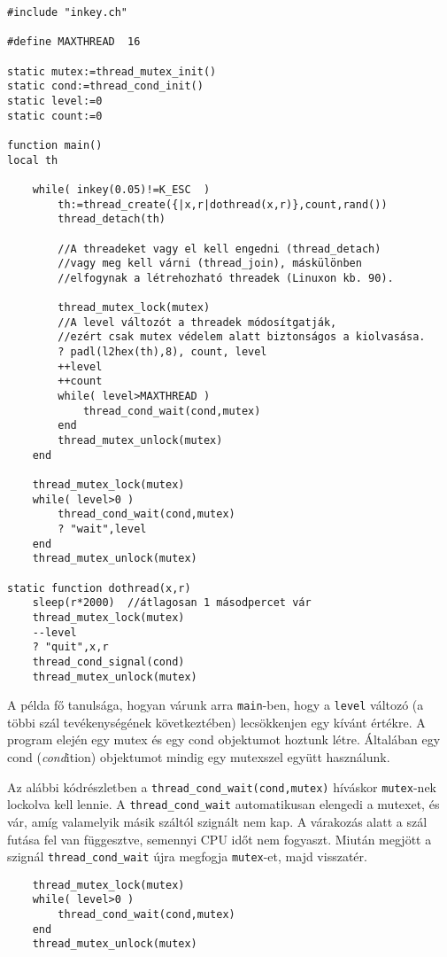 \begin{verbatim}
#include "inkey.ch"

#define MAXTHREAD  16

static mutex:=thread_mutex_init()
static cond:=thread_cond_init()
static level:=0
static count:=0

function main()
local th

    while( inkey(0.05)!=K_ESC  )
        th:=thread_create({|x,r|dothread(x,r)},count,rand())
        thread_detach(th)
        
        //A threadeket vagy el kell engedni (thread_detach)
        //vagy meg kell várni (thread_join), máskülönben
        //elfogynak a létrehozható threadek (Linuxon kb. 90).

        thread_mutex_lock(mutex)
        //A level változót a threadek módosítgatják,
        //ezért csak mutex védelem alatt biztonságos a kiolvasása.
        ? padl(l2hex(th),8), count, level
        ++level
        ++count
        while( level>MAXTHREAD )
            thread_cond_wait(cond,mutex)
        end
        thread_mutex_unlock(mutex)
    end

    thread_mutex_lock(mutex)
    while( level>0 )
        thread_cond_wait(cond,mutex)
        ? "wait",level
    end
    thread_mutex_unlock(mutex)

static function dothread(x,r)
    sleep(r*2000)  //átlagosan 1 másodpercet vár
    thread_mutex_lock(mutex)
    --level
    ? "quit",x,r
    thread_cond_signal(cond)
    thread_mutex_unlock(mutex)
\end{verbatim}


A példa fő tanulsága, 
hogyan várunk arra \verb!main!-ben, hogy a \verb!level! változó 
(a többi szál tevékenységének következtében)
lecsökkenjen egy kívánt értékre.
A program elején egy mutex és egy cond objektumot hoztunk létre.
Általában egy cond ({\em cond}ition) objektumot mindig egy mutexszel együtt használunk.


Az alábbi kódrészletben a \verb!thread_cond_wait(cond,mutex)!
híváskor \verb!mutex!-nek lockolva kell lennie. A \verb!thread_cond_wait!
automatikusan elengedi a mutexet, és vár, amíg valamelyik másik száltól szignált
nem kap. A várakozás alatt a szál futása fel van függesztve, semennyi CPU időt 
nem fogyaszt. Miután megjött a szignál
\verb!thread_cond_wait! újra megfogja \verb!mutex!-et, majd visszatér.
\begin{verbatim}
    thread_mutex_lock(mutex)
    while( level>0 )
        thread_cond_wait(cond,mutex)
    end
    thread_mutex_unlock(mutex)
\end{verbatim}

